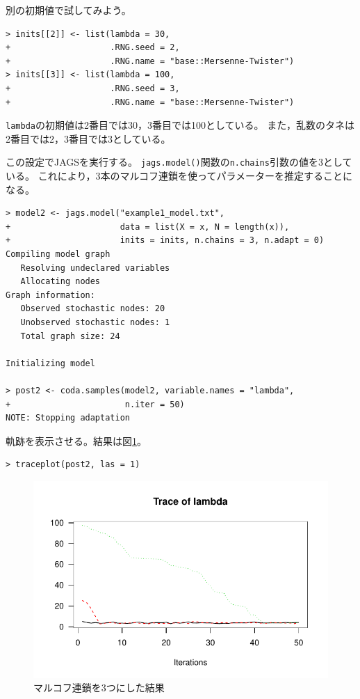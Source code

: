 \documentclass[11pt,uplatex]{jsarticle}
\begin{document}
別の初期値で試してみよう。
\begin{lstlisting}
> inits[[2]] <- list(lambda = 30,
+                    .RNG.seed = 2,
+                    .RNG.name = "base::Mersenne-Twister")
> inits[[3]] <- list(lambda = 100,
+                    .RNG.seed = 3,
+                    .RNG.name = "base::Mersenne-Twister")
\end{lstlisting}
\texttt{lambda}の初期値は2番目では30，3番目では100としている。
また，乱数のタネは2番目では2，3番目では3としている。

この設定で\textsf{JAGS}を実行する。
\texttt{jags.model()}関数の\texttt{n.chains}引数の値を3としている。
これにより，3本のマルコフ連鎖を使ってパラメーターを推定することになる。
\begin{lstlisting}
> model2 <- jags.model("example1_model.txt",
+                      data = list(X = x, N = length(x)),
+                      inits = inits, n.chains = 3, n.adapt = 0)
Compiling model graph
   Resolving undeclared variables
   Allocating nodes
Graph information:
   Observed stochastic nodes: 20
   Unobserved stochastic nodes: 1
   Total graph size: 24

Initializing model

> post2 <- coda.samples(model2, variable.names = "lambda",
+                       n.iter = 50)
NOTE: Stopping adaptation

\end{lstlisting}

軌跡を表示させる。結果は図\ref{fig:trace3}。
\begin{lstlisting}
> traceplot(post2, las = 1)
\end{lstlisting}

\begin{figure}[hbtp]
  \begin{center}
    \includegraphics[bb=0 0 360 240, clip, width=260 bp]{example1-2.pdf}
  \end{center}
  \caption{マルコフ連鎖を3つにした結果}
  \label{fig:trace3}
\end{figure}\noindent
\end{document}

